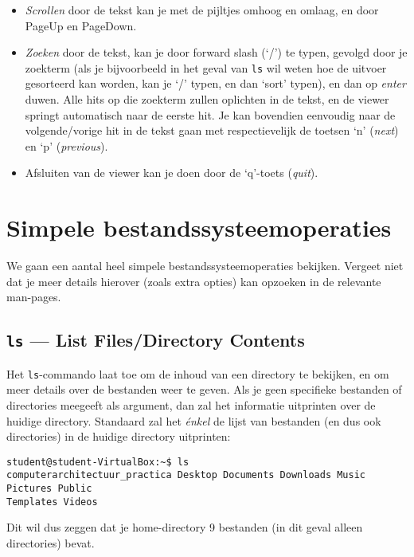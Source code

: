 \documentclass[a4paper,twoside,openany]{memoir}
\begin{document}
\begin{itemize}

  \item \emph{Scrollen} door de tekst kan je met de pijltjes omhoog en omlaag,
    en door PageUp en PageDown.

  \item \emph{Zoeken} door de tekst, kan je door forward slash (`/') te typen,
    gevolgd door je zoekterm (als je bijvoorbeeld in het geval van \verb!ls! wil
    weten hoe de uitvoer gesorteerd kan worden, kan je `/' typen, en
    dan `sort' typen), en dan op \emph{enter} duwen. Alle hits op die zoekterm
    zullen oplichten in de tekst,
    en de viewer springt automatisch naar de eerste hit. Je kan bovendien
    eenvoudig naar de volgende/vorige hit in de tekst gaan met respectievelijk
    de toetsen `n' (\emph{next}) en `p' (\emph{previous}).

  \item {Afsluiten} van de viewer kan je doen door de `q'-toets (\emph{quit}).

\end{itemize}

\chapter{Simpele bestandssysteemoperaties}

We gaan een aantal heel simpele bestandssysteemoperaties bekijken. Vergeet niet
dat je meer details hierover (zoals extra opties) kan opzoeken in de relevante
man-pages.

\section{\texttt{ls} --- List Files/Directory Contents}

Het \verb!ls!-commando laat toe om de inhoud van een directory te bekijken, en
om meer details over de  bestanden weer te geven. Als je geen specifieke
bestanden of directories meegeeft als argument, dan zal het informatie
uitprinten over de huidige
directory. Standaard zal het \emph{énkel} de lijst van bestanden (en dus ook
directories) in de huidige directory uitprinten:

\begin{verbatim}
student@student-VirtualBox:~$ ls
computerarchitectuur_practica Desktop Documents Downloads Music Pictures Public
Templates Videos
\end{verbatim}

Dit wil dus zeggen dat je home-directory 9 bestanden (in dit geval alleen
directories) bevat.
\end{document}
